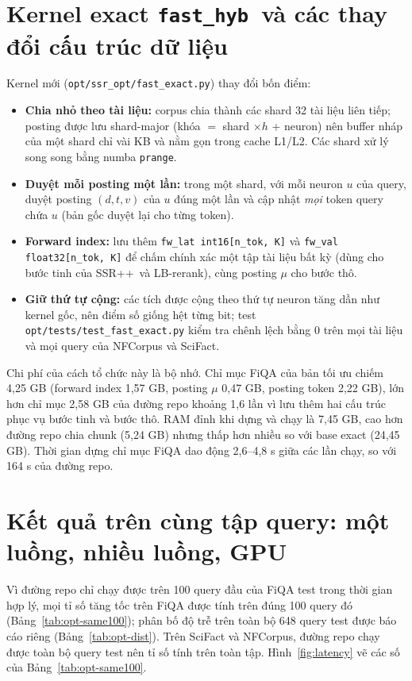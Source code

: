 \documentclass[a4paper,13pt]{extreport}
\theoremstyle{plain}
\newcommand{\ssrpp}{SSR++}
\newcommand{\fasthyb}{\texttt{fast\_hyb}}
\begin{document}
\section{Kernel exact \fasthyb\ và các thay đổi cấu trúc dữ liệu}
\label{sec:fasthyb}
Kernel mới (\texttt{opt/ssr\_opt/fast\_exact.py}) thay đổi bốn điểm:
\begin{itemize}[leftmargin=1.5cm]
  \item \textbf{Chia nhỏ theo tài liệu:} corpus chia thành các shard 32 tài liệu liên tiếp; posting được lưu shard-major (khóa $=$ shard $\times h$ + neuron) nên buffer nháp của một shard chỉ vài KB và nằm gọn trong cache L1/L2. Các shard xử lý song song bằng numba \texttt{prange}.
  \item \textbf{Duyệt mỗi posting một lần:} trong một shard, với mỗi neuron $u$ của query, duyệt posting $(d, t, v)$ của $u$ đúng một lần và cập nhật \emph{mọi} token query chứa $u$ (bản gốc duyệt lại cho từng token).
  \item \textbf{Forward index:} lưu thêm \texttt{fw\_lat int16[n\_tok, K]} và \texttt{fw\_val float32[n\_tok, K]} để chấm chính xác một tập tài liệu bất kỳ (dùng cho bước tinh của \ssrpp\ và LB-rerank), cùng posting $\mu$ cho bước thô.
  \item \textbf{Giữ thứ tự cộng:} các tích được cộng theo thứ tự neuron tăng dần như kernel gốc, nên điểm số giống hệt từng bit; test \texttt{opt/tests/test\_fast\_exact.py} kiểm tra chênh lệch bằng 0 trên mọi tài liệu và mọi query của NFCorpus và SciFact.
\end{itemize}
Chi phí của cách tổ chức này là bộ nhớ. Chỉ mục FiQA của bản tối ưu chiếm 4,25 GB (forward index 1,57 GB, posting $\mu$ 0,47 GB, posting token 2,22 GB), lớn hơn chỉ mục 2,58 GB của đường repo khoảng 1,6 lần vì lưu thêm hai cấu trúc phục vụ bước tinh và bước thô. RAM đỉnh khi dựng và chạy là 7,45 GB, cao hơn đường repo chia chunk (5,24 GB) nhưng thấp hơn nhiều so với base exact (24,45 GB). Thời gian dựng chỉ mục FiQA dao động 2,6--4,8 s giữa các lần chạy, so với 164 s của đường repo.

\section{Kết quả trên cùng tập query: một luồng, nhiều luồng, GPU}
\label{sec:opt-results}
Vì đường repo chỉ chạy được trên 100 query đầu của FiQA test trong thời gian hợp lý, mọi tỉ số tăng tốc trên FiQA được tính trên đúng 100 query đó (Bảng~\ref{tab:opt-same100}); phân bố độ trễ trên toàn bộ 648 query test được báo cáo riêng (Bảng~\ref{tab:opt-dist}). Trên SciFact và NFCorpus, đường repo chạy được toàn bộ query test nên tỉ số tính trên toàn tập. Hình~\ref{fig:latency} vẽ các số của Bảng~\ref{tab:opt-same100}.
\end{document}
